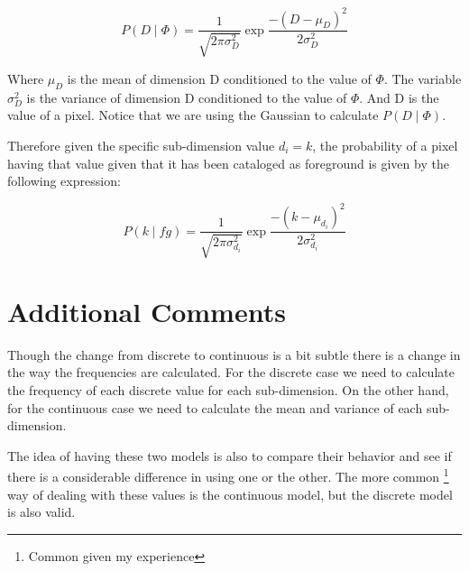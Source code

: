 \documentclass[a4paper,12pt]{report}
\begin{document}
\begin{equation}\label{eq:dimgivenphigauss}
    P(D \mid \Phi) = \frac{1}{\sqrt{2 \pi \sigma_D^2}}
                       \exp{\frac{-(D - \mu_D)^2}{2 \sigma_D^2}}
\end{equation}

Where $\mu_D$ is the mean of dimension D conditioned to the value of $\Phi$. The
variable $\sigma_D^2$ is the variance of dimension D conditioned to the value of
$\Phi$. And D is the value of a pixel. Notice that we are using the Gaussian to
calculate $P(D \mid \Phi)$.

Therefore given the specific sub-dimension value $d_i=k$, the probability of a
pixel having that value given that it has been cataloged as foreground is given
by the following expression:

\begin{equation}\label{eq:dimgivenphigauss}
    P(k \mid fg) = \frac{1}{\sqrt{2 \pi \sigma_{d_i}^2}}
                   \exp{\frac{-(k - \mu_{d_i})^2}{2 \sigma_{d_i}^2}}
\end{equation}

\section{Additional Comments}
Though the change from discrete to continuous is a bit subtle there is a change
in the way the frequencies are calculated. For the discrete case we need to
calculate the frequency of each discrete value for each sub-dimension. On the
other hand, for the continuous case we need to calculate the mean and variance
of each sub-dimension.

The idea of having these two models is also to compare their behavior and see if
there is a considerable difference in using one or the other. The more common
\footnote{Common given my experience} way of dealing with these values is the
continuous model, but the discrete model is also valid.

\listoffixmes
\end{document}
